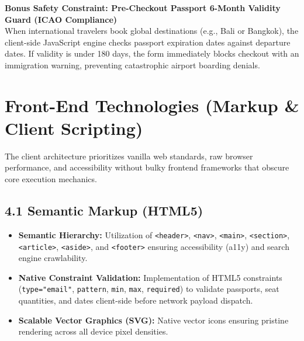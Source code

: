 \documentclass[11pt,a4paper]{article}
\begin{document}
\begin{tcolorbox}[colback=lightgray,colframe=secondary,arc=1mm,boxrule=0.6pt]
\footnotesize\textbf{Bonus Safety Constraint: Pre-Checkout Passport 6-Month Validity Guard (ICAO Compliance)}\\
When international travelers book global destinations (e.g., Bali or Bangkok), the client-side JavaScript engine checks passport expiration dates against departure dates. If validity is under 180 days, the form immediately blocks checkout with an immigration warning, preventing catastrophic airport boarding denials.
\end{tcolorbox}

\newpage

\section{Front-End Technologies (Markup \& Client Scripting)}

The client architecture prioritizes vanilla web standards, raw browser performance, and accessibility without bulky frontend frameworks that obscure core execution mechanics.

\subsection{4.1 Semantic Markup (HTML5)}
\begin{itemize}[leftmargin=*]
    \item \textbf{Semantic Hierarchy:} Utilization of \texttt{<header>}, \texttt{<nav>}, \texttt{<main>}, \texttt{<section>}, \texttt{<article>}, \texttt{<aside>}, and \texttt{<footer>} ensuring accessibility (a11y) and search engine crawlability.
    \item \textbf{Native Constraint Validation:} Implementation of HTML5 constraints (\texttt{type="email"}, \texttt{pattern}, \texttt{min}, \texttt{max}, \texttt{required}) to validate passports, seat quantities, and dates client-side before network payload dispatch.
    \item \textbf{Scalable Vector Graphics (SVG):} Native vector icons ensuring pristine rendering across all device pixel densities.
\end{itemize}
\end{document}
